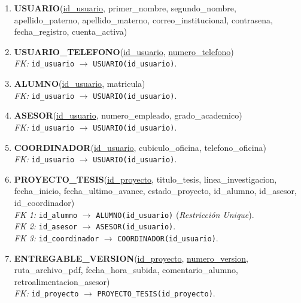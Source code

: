 \begin{enumerate}
    \item \textbf{USUARIO}(\underline{id\_usuario}, primer\_nombre, segundo\_nombre, apellido\_paterno, apellido\_materno, correo\_institucional, contrasena, fecha\_registro, cuenta\_activa)
    
    \item \textbf{USUARIO\_TELEFONO}(\underline{id\_usuario}, \underline{numero\_telefono}) \\
    \textit{FK:} \texttt{id\_usuario} $\rightarrow$ \texttt{USUARIO(id\_usuario)}.
    
    \item \textbf{ALUMNO}(\underline{id\_usuario}, matricula) \\
    \textit{FK:} \texttt{id\_usuario} $\rightarrow$ \texttt{USUARIO(id\_usuario)}.
    
    \item \textbf{ASESOR}(\underline{id\_usuario}, numero\_empleado, grado\_academico) \\
    \textit{FK:} \texttt{id\_usuario} $\rightarrow$ \texttt{USUARIO(id\_usuario)}.
    
    \item \textbf{COORDINADOR}(\underline{id\_usuario}, cubiculo\_oficina, telefono\_oficina) \\
    \textit{FK:} \texttt{id\_usuario} $\rightarrow$ \texttt{USUARIO(id\_usuario)}.
    
    \item \textbf{PROYECTO\_TESIS}(\underline{id\_proyecto}, titulo\_tesis, linea\_investigacion, fecha\_inicio, fecha\_ultimo\_avance, estado\_proyecto, id\_alumno, id\_asesor, id\_coordinador) \\
    \textit{FK 1:} \texttt{id\_alumno} $\rightarrow$ \texttt{ALUMNO(id\_usuario)} (\textit{Restricción Unique}). \\
    \textit{FK 2:} \texttt{id\_asesor} $\rightarrow$ \texttt{ASESOR(id\_usuario)}. \\
    \textit{FK 3:} \texttt{id\_coordinador} $\rightarrow$ \texttt{COORDINADOR(id\_usuario)}.
    
    \item \textbf{ENTREGABLE\_VERSION}(\underline{id\_proyecto}, \underline{numero\_version}, ruta\_archivo\_pdf, fecha\_hora\_subida, comentario\_alumno, retroalimentacion\_asesor) \\
    \textit{FK:} \texttt{id\_proyecto} $\rightarrow$ \texttt{PROYECTO\_TESIS(id\_proyecto)}.
    

\end{enumerate}
